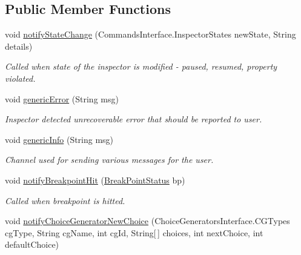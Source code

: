 \subsection*{Public Member Functions}
\begin{DoxyCompactItemize}
\item 
void \hyperlink{interfacegov_1_1nasa_1_1jpf_1_1inspector_1_1interfaces_1_1_inspector_call_backs_a347d6a1237962eb4305f45b718004c53}{notify\+State\+Change} (Commands\+Interface.\+Inspector\+States new\+State, String details)
\begin{DoxyCompactList}\small\item\em Called when state of the inspector is modified -\/ paused, resumed, property violated. \end{DoxyCompactList}\item 
void \hyperlink{interfacegov_1_1nasa_1_1jpf_1_1inspector_1_1interfaces_1_1_inspector_call_backs_ac9e585a3096b0be7e25dc789b6b39cfa}{generic\+Error} (String msg)
\begin{DoxyCompactList}\small\item\em Inspector detected unrecoverable error that should be reported to user. \end{DoxyCompactList}\item 
void \hyperlink{interfacegov_1_1nasa_1_1jpf_1_1inspector_1_1interfaces_1_1_inspector_call_backs_afe2463c7186265f972991c9c7ab4ec19}{generic\+Info} (String msg)
\begin{DoxyCompactList}\small\item\em Channel used for sending various messages for the user. \end{DoxyCompactList}\item 
void \hyperlink{interfacegov_1_1nasa_1_1jpf_1_1inspector_1_1interfaces_1_1_inspector_call_backs_a130333a1ece0818a1161ca8597d027e6}{notify\+Breakpoint\+Hit} (\hyperlink{interfacegov_1_1nasa_1_1jpf_1_1inspector_1_1interfaces_1_1_break_point_status}{Break\+Point\+Status} bp)
\begin{DoxyCompactList}\small\item\em Called when breakpoint is hitted. \end{DoxyCompactList}\item 
void \hyperlink{interfacegov_1_1nasa_1_1jpf_1_1inspector_1_1interfaces_1_1_inspector_call_backs_a8ebe532769c4bced7461e073fa79a7a0}{notify\+Choice\+Generator\+New\+Choice} (Choice\+Generators\+Interface.\+C\+G\+Types cg\+Type, String cg\+Name, int cg\+Id, String\mbox{[}$\,$\mbox{]} choices, int next\+Choice, int default\+Choice)

\end{DoxyCompactItemize}
